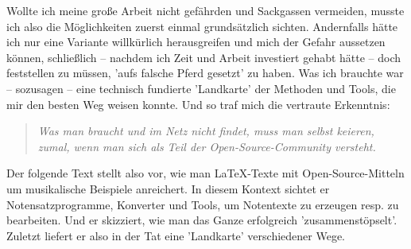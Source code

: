 Wollte ich meine große Arbeit nicht gefährden und Sackgassen vermeiden, musste
ich also die Möglichkeiten zuerst einmal grundsätzlich sichten. Andernfalls
hätte ich nur eine Variante willkürlich herausgreifen und mich der Gefahr
aussetzen können, schließlich -- nachdem ich Zeit und Arbeit investiert gehabt
hätte -- doch feststellen zu müssen, 'aufs falsche Pferd gesetzt' zu haben. Was
ich brauchte war -- sozusagen -- eine technisch fundierte 'Landkarte' der
Methoden und Tools, die mir den besten Weg weisen konnte. Und so traf mich die
vertraute Erkenntnis:

\begin{quote}\textit{Was man braucht und im Netz nicht findet, muss man selbst
keieren, zumal, wenn man sich als Teil der Open-Source-Community versteht.}
\end{quote}

Der folgende Text stellt also vor, wie man \LaTeX-Texte mit Open-Source-Mitteln
um musikalische Beispiele anreichert. In diesem Kontext sichtet er
Notensatzprogramme, Konverter und Tools, um Notentexte zu erzeugen resp.
zu bearbeiten. Und er skizziert, wie man das Ganze erfolgreich
'zusammenstöpselt'. Zuletzt liefert er also in der Tat eine 'Landkarte' 
verschiedener Wege.

%
